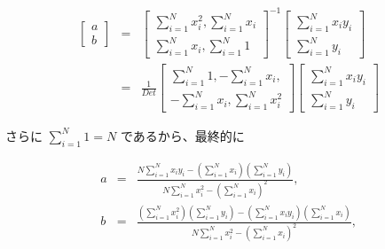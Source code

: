 \documentclass[12pt]{jsarticle}
\def\sumdata{\sum_{i=1}^{N}}
\begin{document}
\begin{eqnarray}
  \begin{bmatrix}
    a \\
    b
  \end{bmatrix}
  &=&
  \begin{bmatrix}
    \sumdata x_i^2, \sumdata x_i \\
    \sumdata x_i, \sumdata 1
  \end{bmatrix} ^{-1}
  \begin{bmatrix}
    \sumdata x_i y_i \\
    \sumdata y_i
  \end{bmatrix} \nonumber \\
  &=&
  \frac{1}{Det}
  \begin{bmatrix}
    \sumdata 1, - \sumdata x_i, \\
    - \sumdata x_i, \sumdata x_i^2
  \end{bmatrix}
  \begin{bmatrix}
    \sumdata x_i y_i \\
    \sumdata y_i
  \end{bmatrix}
\end{eqnarray}

さらに $\sumdata 1 = N$ であるから、最終的に

\begin{eqnarray}
  a &=& \frac{N \sumdata x_i y_i -
    \left( \sumdata x_i \right) \left( \sumdata y_i \right)
  }{N \sumdata x_i^2 - \left( \sumdata x_i \right)^2}, \nonumber \\
  b &=& \frac{
    \left( \sumdata x_i^2 \right) \left( \sumdata y_i \right)
    -
    \left( \sumdata x_i y_i \right) \left( \sumdata x_i \right)
  }{N \sumdata x_i^2 - \left( \sumdata x_i \right)^2}, \nonumber \\
\end{eqnarray}
\end{document}
